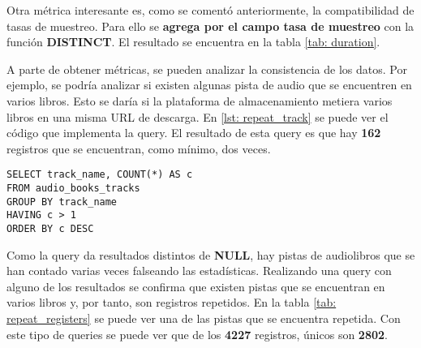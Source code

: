 Otra métrica interesante es, como se comentó anteriormente, la compatibilidad de tasas de muestreo. Para ello se \textbf{agrega por el campo tasa de muestreo} con la función \textbf{DISTINCT}. El resultado se encuentra en la tabla \ref{tab: duration}.

A parte de obtener métricas, se pueden analizar la consistencia de los datos. Por ejemplo, se podría analizar si existen algunas pista de audio que se encuentren en varios libros. Esto se daría si la plataforma de almacenamiento metiera varios libros en una misma \gls{URL} de descarga. En \ref{lst: repeat_track} se puede ver el código que implementa la query. El resultado de esta query es que hay \textbf{162} registros que se encuentran, como mínimo, dos veces.

\begin{lstlisting}[style=SQL,basicstyle=\tiny\ttfamily, caption={Query para obtener las pistas repetidas en varios libros},captionpos=b, label={lst: repeat_track}]
SELECT track_name, COUNT(*) AS c
FROM audio_books_tracks
GROUP BY track_name
HAVING c > 1
ORDER BY c DESC
\end{lstlisting}

Como la query da resultados distintos de \textbf{NULL}, hay pistas de audiolibros que se han contado varias veces falseando las estadísticas. Realizando una query con alguno de los resultados se confirma que existen pistas que se encuentran en varios libros y, por tanto, son registros repetidos. En la tabla \ref{tab: repeat_registers} se puede ver una de las pistas que se encuentra repetida. Con este tipo de queries se puede ver que de los \textbf{4227} registros, únicos son \textbf{2802}.
\begin{table} [h!]
	\centering
	\vspace*{3pt}
	\caption{Ejemplo de registros repetidos}\label{tab: repeat_registers}
\end{table}





